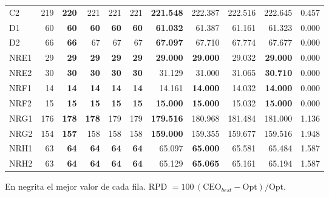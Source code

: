 \begin{table}[htbp]
\begin{tabular}{lrrrrrrrrrr}
C2 & 219 & \textbf{220} & 221 & 221 & 221 & \textbf{221.548} & 222.387 & 222.516 & 222.645 & 0.457 \\
D1 & 60 & \textbf{60} & \textbf{60} & \textbf{60} & \textbf{60} & \textbf{61.032} & 61.387 & 61.161 & 61.323 & 0.000 \\
D2 & 66 & \textbf{66} & 67 & 67 & 67 & \textbf{67.097} & 67.710 & 67.774 & 67.677 & 0.000 \\
NRE1 & 29 & \textbf{29} & \textbf{29} & \textbf{29} & \textbf{29} & \textbf{29.000} & \textbf{29.000} & 29.032 & \textbf{29.000} & 0.000 \\
NRE2 & 30 & \textbf{30} & \textbf{30} & \textbf{30} & \textbf{30} & 31.129 & 31.000 & 31.065 & \textbf{30.710} & 0.000 \\
NRF1 & 14 & \textbf{14} & \textbf{14} & \textbf{14} & \textbf{14} & 14.161 & \textbf{14.000} & 14.032 & \textbf{14.000} & 0.000 \\
NRF2 & 15 & \textbf{15} & \textbf{15} & \textbf{15} & \textbf{15} & \textbf{15.000} & \textbf{15.000} & 15.032 & \textbf{15.000} & 0.000 \\
NRG1 & 176 & \textbf{178} & \textbf{178} & 179 & 179 & \textbf{179.516} & 180.968 & 181.484 & 181.000 & 1.136 \\
NRG2 & 154 & \textbf{157} & 158 & 158 & 158 & \textbf{159.000} & 159.355 & 159.677 & 159.516 & 1.948 \\
NRH1 & 63 & \textbf{64} & \textbf{64} & \textbf{64} & \textbf{64} & 65.097 & \textbf{65.000} & 65.581 & 65.484 & 1.587 \\
NRH2 & 63 & \textbf{64} & \textbf{64} & \textbf{64} & \textbf{64} & 65.129 & \textbf{65.065} & 65.161 & 65.194 & 1.587 \\
\bottomrule
\end{tabular}

\vspace{2pt}
\begin{minipage}{\textwidth}\scriptsize
En negrita el mejor valor de cada fila. RPD $=100\,(\text{CEO}_{best}-\text{Opt})/\text{Opt}$.
\end{minipage}
\end{table}

